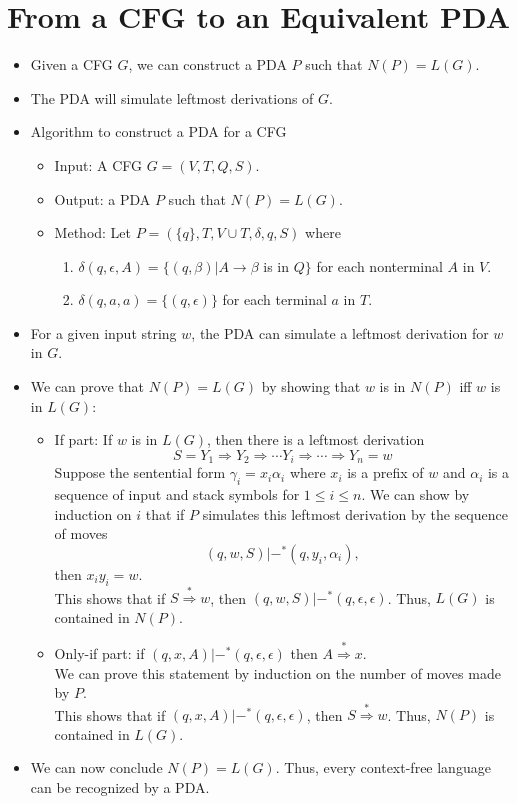 \documentclass[]{article}
\begin{document}
\section{From a CFG to an Equivalent PDA}
  \begin{itemize}
    \item Given a CFG $G$, we can construct a PDA $P$ such that $N(P) = L(G)$.
    \item The PDA will simulate leftmost derivations of $G$.
    \item Algorithm to construct a PDA for a CFG
      \begin{itemize}
        \item Input: A CFG $G = (V,T,Q,S)$.
        \item Output: a PDA $P$ such that $N(P) = L(G)$.
        \item Method: Let $P = (\{q\},T,V\cup{T},\delta,q,S)$ where
          \begin{enumerate}
            \item $\delta(q,\epsilon,A) = \{(q,\beta) | A \rightarrow \beta$ is 
            in $Q \}$ for each nonterminal $A$ in $V$.
            \item $\delta(q,a,a) = \{(q,\epsilon)\}$ for each terminal $a$ in 
            $T$.
          \end{enumerate}
      \end{itemize}
    \item For a given input string $w$, the PDA can simulate a leftmost 
    derivation for $w$ in $G$.
    \item We can prove that $N(P) = L(G)$ by showing that $w$ is in $N(P)$ iff 
    $w$ is in $L(G)$:
      \begin{itemize}
        \item If part: If $w$ is in $L(G)$, then there is a leftmost derivation
          \[ 
            S = Y_1 \Rightarrow Y_2 \Rightarrow \cdots Y_i \Rightarrow \cdots 
            \Rightarrow Y_n = w
          \]
        Suppose the sentential form $\gamma_i = x_i\alpha_i$ where $x_i$ is a 
        prefix of $w$ and $\alpha_i$ is a sequence of input and stack symbols 
        for $1 \leq i \leq n$. We can show by induction on $i$ that if $P$ 
        simulates this leftmost derivation by the sequence of moves
          \[ (q,w,S) |-^* (q,y_i,\alpha_i), \]
        then $x_iy_i = w$. \\ 
        This shows that if $S \overset{*}{\Rightarrow} w$, then $(q,w,S) |-^* 
        (q,\epsilon,\epsilon)$. Thus, $L(G)$ is contained in $N(P)$.
        \item Only-if part: if $(q,x,A) |-^*(q,\epsilon,\epsilon)$ then $A 
        \overset{*}{\Rightarrow} x$. \\
        We can prove this statement by induction on the number of moves made by 
        $P$. \\
        This shows that if $(q,x,A) |-^*(q,\epsilon,\epsilon)$, then $S 
        \overset{*}{\Rightarrow} w$. Thus, $N(P)$ is contained in $L(G)$.
      \end{itemize}
    \item We can now conclude $N(P) = L(G)$. Thus, every context-free language 
    can be recognized by a PDA.
  \end{itemize}
\end{document}
